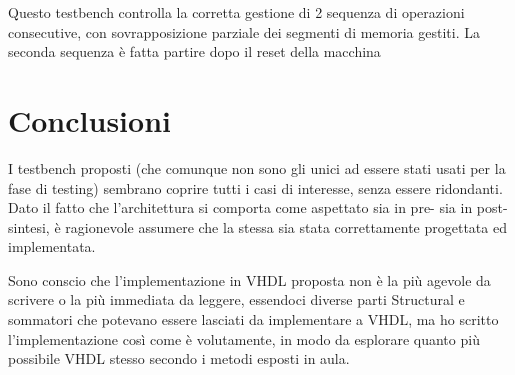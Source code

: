 \documentclass{article}
\begin{document}
Questo testbench controlla la corretta gestione di 2 sequenza di operazioni consecutive, con sovrapposizione parziale dei segmenti di memoria gestiti. La seconda sequenza è fatta partire dopo il reset della macchina



\section{Conclusioni}
I testbench proposti (che comunque non sono gli unici ad essere stati usati per la fase di testing) sembrano coprire tutti i casi di interesse, senza essere ridondanti. Dato il fatto che l’architettura si comporta come aspettato sia in pre- sia in post-sintesi, è ragionevole assumere che la stessa sia stata correttamente progettata ed implementata.

Sono conscio che l’implementazione in VHDL proposta non è la più agevole da scrivere o la più immediata da leggere, essendoci diverse parti Structural e sommatori che potevano essere lasciati da implementare a VHDL, ma ho scritto l'implementazione così come è volutamente, in modo da esplorare quanto più possibile VHDL stesso secondo i metodi esposti in aula.
\end{document}
